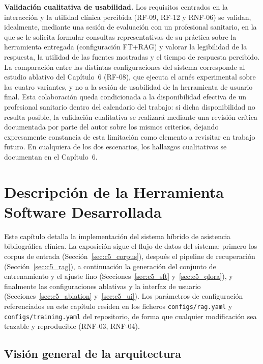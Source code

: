 \documentclass[11pt,a4paper,spanish]{book}
\numberwithin{equation}{chapter}
\numberwithin{figure}{chapter}
\begin{document}
\textbf{Validación cualitativa de usabilidad.} Los requisitos centrados en la interacción y la utilidad clínica percibida (RF-09, RF-12 y RNF-06) se validan, idealmente, mediante una sesión de evaluación con un profesional sanitario, en la que se le solicita formular consultas representativas de su práctica sobre la herramienta entregada (configuración FT+RAG) y valorar la legibilidad de la respuesta, la utilidad de las fuentes mostradas y el tiempo de respuesta percibido. La comparación entre las distintas configuraciones del sistema corresponde al estudio ablativo del Capítulo~6 (RF-08), que ejecuta el arnés experimental sobre las cuatro variantes, y no a la sesión de usabilidad de la herramienta de usuario final. Esta colaboración queda condicionada a la disponibilidad efectiva de un profesional sanitario dentro del calendario del trabajo: si dicha disponibilidad no resulta posible, la validación cualitativa se realizará mediante una revisión crítica documentada por parte del autor sobre los mismos criterios, dejando expresamente constancia de esta limitación como elemento a revisitar en trabajo futuro. En cualquiera de los dos escenarios, los hallazgos cualitativos se documentan en el Capítulo~6.

\chapter[Descripción de la Herramienta Software Desarrollada]{Descripción de la Herramienta\\ Software Desarrollada}
\label{cap:diseno}

Este capítulo detalla la implementación del sistema híbrido de asistencia bibliográfica clínica. La exposición sigue el flujo de datos del sistema: primero los corpus de entrada (Sección~\ref{sec:c5_corpus}), después el pipeline de recuperación (Sección~\ref{sec:c5_rag}), a continuación la generación del conjunto de entrenamiento y el ajuste fino (Secciones~\ref{sec:c5_sft} y~\ref{sec:c5_qlora}), y finalmente las configuraciones ablativas y la interfaz de usuario (Secciones~\ref{sec:c5_ablation} y~\ref{sec:c5_ui}). Los parámetros de configuración referenciados en este capítulo residen en los ficheros \texttt{configs/rag.yaml} y \texttt{configs/training.yaml} del repositorio, de forma que cualquier modificación sea trazable y reproducible (RNF-03, RNF-04).

\section{Visión general de la arquitectura}
\label{sec:c5_overview}
\end{document}
